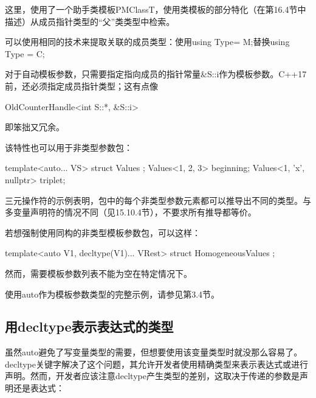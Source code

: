这里，使用了一个助手类模板PMClassT，使用类模板的部分特化（在第16.4节中描述）从成员指针类型的“父”类类型中检索。

\begin{notice}
可以使用相同的技术来提取关联的成员类型：使用using Type= M;替换using Type = C;
\end{notice}

对于自动模板参数，只需要指定指向成员的指针常量\&S::i作为模板参数。C++17前，还必须指定成员指针类型；这有点像

\begin{cpp}
OldCounterHandle<int S::*, &S::i>
\end{cpp}

即笨拙又冗余。

该特性也可以用于非类型参数包：

\begin{cpp}
template<auto... VS> struct Values {
};
Values<1, 2, 3> beginning;
Values<1, 'x', nullptr> triplet;
\end{cpp}

三元操作符的示例表明，包中的每个非类型参数元素都可以推导出不同的类型。与多变量声明符的情况不同（见15.10.4节），不要求所有推导都等价。

若想强制使用同构的非类型模板参数包，可以这样：

\begin{cpp}
template<auto V1, decltype(V1)... VRest> struct HomogeneousValues {
};
\end{cpp}

然而，需要模板参数列表不能为空在特定情况下。

使用auto作为模板参数类型的完整示例，请参见第3.4节。

\subsection{用decltype表示表达式的类型}

虽然auto避免了写变量类型的需要，但想要使用该变量类型时就没那么容易了。decltype关键字解决了这个问题，其允许开发者使用精确类型来表示表达式或进行声明。然而，开发者应该注意decltype产生类型的差别，这取决于传递的参数是声明还是表达式：

